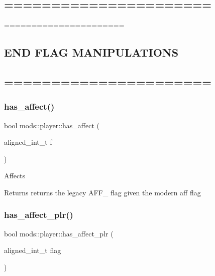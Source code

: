 \subsection*{====================== }

====================== \subsection*{E\+ND F\+L\+AG M\+A\+N\+I\+P\+U\+L\+A\+T\+I\+O\+NS }

\subsection*{====================== }\mbox{\label{classmods_1_1player_ae7ad590bc136eac7a54ed0071a3e882b}} 
\subsubsection{\texorpdfstring{has\+\_\+affect()}{has\_affect()}}
{\footnotesize\ttfamily bool mods\+::player\+::has\+\_\+affect (\begin{DoxyParamCaption}\item[{aligned\+\_\+int\+\_\+t}]{f }\end{DoxyParamCaption})}

Affects \begin{DoxyReturn}{Returns}
returns the legacy A\+F\+F\+\_\+ flag given the modern aff flag 
\end{DoxyReturn}
\mbox{\label{classmods_1_1player_ae07901c25cbe93b8c259720f1662e5d3}} 
\subsubsection{\texorpdfstring{has\+\_\+affect\+\_\+plr()}{has\_affect\_plr()}}
{\footnotesize\ttfamily bool mods\+::player\+::has\+\_\+affect\+\_\+plr (\begin{DoxyParamCaption}\item[{aligned\+\_\+int\+\_\+t}]{flag }\end{DoxyParamCaption})}


